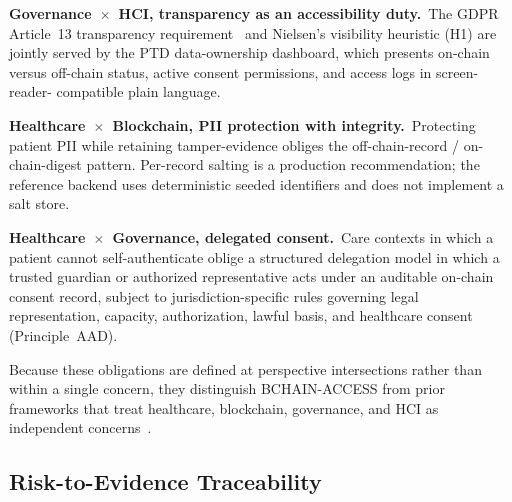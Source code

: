 \documentclass[journal]{IEEEtran}
\begin{document}
\noindent\textbf{Governance~$\times$~HCI, transparency as an accessibility duty.}\
The GDPR Article~13 transparency requirement~\cite{gdpr2016} and Nielsen's visibility heuristic (H1)
are jointly served by the PTD data-ownership dashboard, which presents on-chain versus
off-chain status, active consent permissions, and access logs in screen-reader-
compatible plain language.

\noindent\textbf{Healthcare~$\times$~Blockchain, PII protection with integrity.}\
Protecting patient PII while retaining tamper-evidence obliges the off-chain-record /
on-chain-digest pattern. Per-record salting is a production recommendation; the reference backend uses deterministic seeded identifiers and does not implement a salt store.

\noindent\textbf{Healthcare~$\times$~Governance, delegated consent.}\ Care contexts
in which a patient cannot self-authenticate oblige a structured delegation model in
which a trusted guardian or authorized representative acts under an auditable on-chain
consent record, subject to jurisdiction-specific rules governing legal representation,
capacity, authorization, lawful basis, and healthcare consent (Principle~AAD).

Because these obligations are defined at perspective intersections rather than within a
single concern, they distinguish BCHAIN-ACCESS from prior frameworks that treat
healthcare, blockchain, governance, and HCI as independent
concerns~\cite{khalid2023blockchain,tharani2022ui}.

\subsection{Risk-to-Evidence Traceability}
\end{document}
